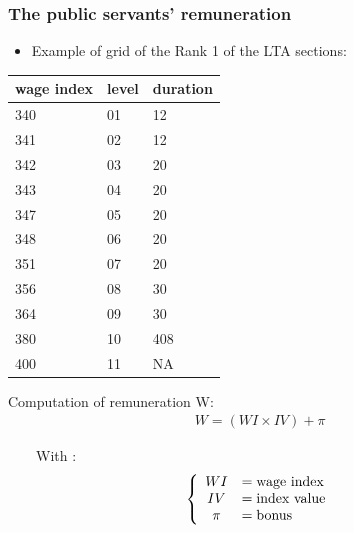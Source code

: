 \documentclass[xcolor=table,ignorenonframetext,12pt]{beamer}
\begin{document}
\begin{frame}
\frametitle{The public servants' remuneration}

\begin{itemize}
	\item Example of grid of the Rank 1 of the LTA sections:
\end{itemize}

\begin{minipage}{0.5\textwidth}
	\vspace{-0.1cm}
	\begin{tabular}{lll}
		\toprule
		{}   wage index & level & duration  \\
		\midrule
		340 &      01 &        12 \\
		341 &      02 &        12 \\
		342 &      03 &        20  \\
		343 &      04 &        20  \\
		347 &      05 &        20 \\
		348 &      06 &        20 \\
		351 &      07 &        20  \\  
		356 &      08 &        30  \\
		364 &      09 &        30  \\
		380 &      10 &        408 \\
		400 &      11 &       NA \\
		\bottomrule
	\end{tabular}
\end{minipage}%
\begin{minipage}[l]{0.5\textwidth}
	\small
	Computation of remuneration W: 
	\begin{equation*}
	\begin{array}{c}
	W =  (WI \times IV) + \pi
	\end{array} 
	\end{equation*}
	
	~~~~With :
	\vspace{-0.1cm}
	\begin{equation*}
	\left\{\begin{array}{c  l}
	WI   &= \text{wage index}  \\
	IV   &= \text{index value}   \\
	\pi   &= \text{bonus}   \\
	\end{array} \right.  
	\end{equation*}
	\normalsize
\end{minipage}

\end{frame}
\end{document}
